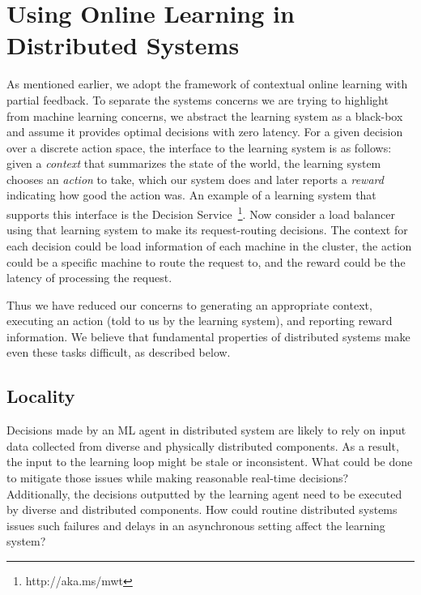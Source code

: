 \documentclass[a4paper,twocolumn]{article}
\begin{document}
\section{Using Online Learning in Distributed Systems}

As mentioned earlier, we adopt the framework of contextual online learning with
partial feedback.  To separate the systems concerns we are trying to highlight
from machine learning concerns, we abstract the learning system as a black-box
and assume it provides optimal decisions with zero latency. For a given decision
over a discrete action space, the interface to the learning system is as
follows: given a {\em context} that summarizes the state of the world, the
learning system chooses an {\em action} to take, which our system does and later
reports a {\em reward} indicating how good the action was. An example of a
learning system that supports this interface is the Decision
Service~\footnote{http://aka.ms/mwt}. Now consider a load balancer using that
learning system to make its request-routing decisions. The context for each
decision could be load information of each machine in the cluster, the action
could be a specific machine to route the request to, and the reward could be the
latency of processing the request.

Thus we have reduced our concerns to generating an appropriate context,
executing an action (told to us by the learning system), and reporting reward
information.  We believe that fundamental properties of distributed systems make
even these tasks difficult, as described below.

\subsection*{Locality}

Decisions made by an ML agent in distributed system are likely to rely on input
data collected from diverse and physically distributed components. As a result,
the input to the learning loop might be stale or inconsistent. What could be
done to mitigate those issues while making reasonable real-time decisions?
Additionally, the decisions outputted by the learning agent need to be executed
by diverse and distributed components. How could routine distributed systems
issues such failures and delays in an asynchronous setting affect the learning
system?
\end{document}
